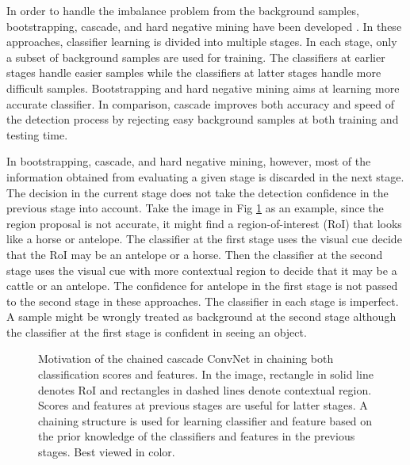\documentclass[10pt,twocolumn,letterpaper]{article}
\begin{document}
In order to handle the imbalance problem from the background samples, bootstrapping, cascade, and hard negative mining have been developed \cite{sung1996learning,Dalal:HOG,Viola:HaarConf}. In these approaches, classifier learning is divided into multiple stages. In each stage, only a subset of background samples are used for training. The classifiers at earlier stages handle easier samples while the classifiers at latter stages handle more difficult samples. Bootstrapping and hard negative mining aims at learning more accurate classifier.  In comparison, cascade improves both accuracy and speed of the detection process by rejecting easy background samples at both training and testing time. 

In bootstrapping, cascade, and hard negative mining, however, most of the information obtained from evaluating a given stage is discarded in the next stage. The decision in the current stage does not take the detection confidence in the previous stage into account. Take the image in Fig \ref{fig:overview} as an example, since the region proposal is not accurate, it might find a region-of-interest (RoI) that looks like a horse or antelope. The classifier at the first stage uses the visual cue decide that the RoI may be an antelope or a horse. Then the classifier at the second stage uses the visual cue with more contextual region to decide that it may be a cattle or an antelope. The confidence for antelope in the first stage is not  passed to the second stage in these  approaches. The classifier in each stage is imperfect. A sample might be wrongly treated as background at the second stage although the classifier at the first stage is confident in seeing an object.

\begin{figure}
\begin{center}
\centerline{}
\end{center}
\vspace{-10pt}
   \caption{Motivation of the chained cascade ConvNet in chaining both classification scores and features. In the image, rectangle  in solid line denotes RoI and rectangles in dashed lines denote contextual region. Scores and features at previous stages are useful for latter stages. A chaining structure is used for learning classifier and feature based on the prior knowledge of the classifiers and features in the previous stages. Best viewed in color.}
\label{fig:overview}
\end{figure}
\end{document}
